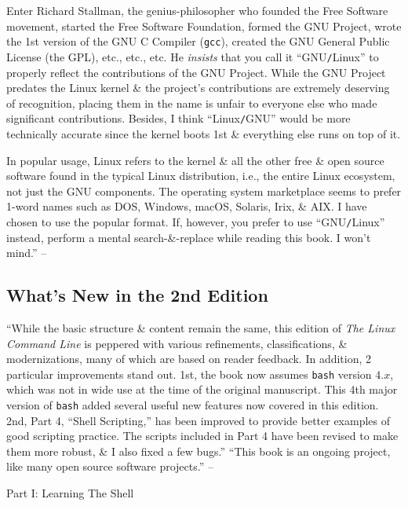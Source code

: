 \documentclass[oneside]{book}
\numberwithin{equation}{section}
\begin{document}
Enter Richard Stallman, the genius-philosopher who founded the Free Software movement, started the Free Software Foundation, formed the GNU Project, wrote the 1st version of the GNU C Compiler (\texttt{gcc}), created the GNU General Public License (the GPL), etc., etc., etc. He \textit{insists} that you call it ``GNU\texttt{/}Linux'' to properly reflect the contributions of the GNU Project. While the GNU Project predates the Linux kernel \& the project's contributions are extremely deserving of recognition, placing them in the name is unfair to everyone else who made significant contributions. Besides, I think ``Linux\texttt{/}GNU'' would be more technically accurate since the kernel boots 1st \& everything else runs on top of it.

In popular usage, Linux refers to the kernel \& all the other free \& open source software found in the typical Linux distribution, i.e., the entire Linux ecosystem, not just the GNU components. The operating system marketplace seems to prefer 1-word names such as DOS, Windows, macOS, Solaris, Irix, \& AIX. I have chosen to use the popular format. If, however, you prefer to use ``GNU\texttt{/}Linux'' instead, perform a mental search-\&-replace while reading this book. I won't mind.'' -- \cite[pp. 34--36]{Shotts2019}

\subsection*{What's New in the 2nd Edition}
``While the basic structure \& content remain the same, this edition of \textit{The Linux Command Line} is peppered with various refinements, classifications, \& modernizations, many of which are based on reader feedback. In addition, 2 particular improvements stand out. 1st, the book now assumes \texttt{bash} version $4.x$,  which was not in wide use at the time of the original manuscript. This 4th major version of \texttt{bash} added several useful new features now covered in this edition. 2nd, Part 4, ``Shell Scripting,'' has been improved to provide better examples of good scripting practice. The scripts included in Part 4 have been revised to make them more robust, \& I also fixed a few bugs.'' ``This book is an ongoing project, like many open source software projects.'' -- \cite[p. 36]{Shotts2019}


\begin{center}
	\huge Part I: Learning The Shell
\end{center}
\end{document}
